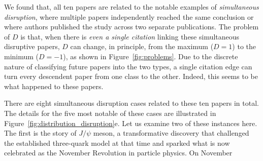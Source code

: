 \documentclass[12pt]{article}
\begin{document}
We found that, all ten papers are related to the notable examples of \emph{simultaneous disruption}, where multiple papers independently reached the same conclusion or where authors published the study across two separate publications. The problem of $D$ is that, when there is \emph{even a single citation} linking these simultaneous disruptive papers, $D$ can change, in principle, from the maximum ($D = 1$) to the minimum ($D = -1$), as shown in Figure~\ref{fig:problems}. Due to the discrete nature of classifying future papers into the two types, a single citation edge can turn every descendent paper from one class to the other. Indeed, this seems to be what happened to these papers. 

There are eight simultaneous disruption cases related to these ten papers in total. The details for the five most notable of these cases are illustrated in Figure~\ref{fig:distribution_disruption}e. Let us examine two of these instances here. The first is the story of $J/\psi$ meson, a transformative discovery that challenged the established three-quark model at that time and sparked what is now celebrated as the November Revolution in particle physics. On November 
\end{document}

